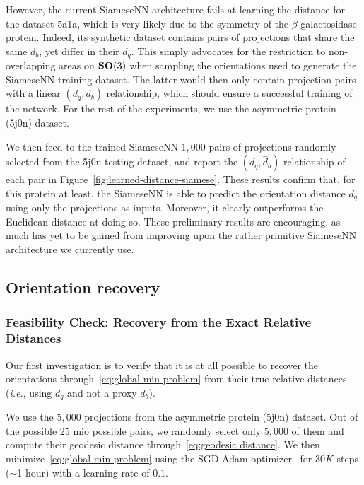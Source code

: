 However, the current SiameseNN architecture fails at learning the distance for the dataset 5a1a, which is very likely due to the symmetry of the $\beta$-galactosidase protein. Indeed, its synthetic dataset contains pairs of projections that share the same $d_b$, yet differ in their $d_q$. This simply advocates for the restriction to non-overlapping areas on $\mathrm{\mathbf{SO}}(3)$ when sampling the orientations used to generate the SiameseNN training dataset. The latter would then only contain projection pairs with a linear $(d_q,d_b)$ relationship, which should ensure a successful training of the network. For the rest of the experiments, we use the asymmetric protein (5j0n) dataset.

We then feed to the trained SiameseNN $1,000$ pairs of projections randomly selected from the 5j0n testing dataset, and report the $(d_q,\widehat{d}_b)$ relationship of each pair in Figure~\ref{fig:learned-distance-siamese}. These results confirm that, for this protein at least, the SiameseNN is able to predict the orientation distance $d_q$ using only the projections as inputs. Moreover, it clearly outperforms the Euclidean distance at doing so. These preliminary results are encouraging, as much has yet to be gained from improving upon the rather primitive SiameseNN architecture we currently use.

\subsection{Orientation recovery}

\subsubsection{Feasibility Check: Recovery from the Exact Relative Distances}
\label{subsec:5-6-3-sanity-check}

Our first investigation is to verify that it is at all possible to recover the orientations through~\eqref{eq:global-min-problem} from their true relative distances (\textit{i.e.}, using $d_q$ and not a proxy $d_b$).

We use the $5,000$ projections from the asymmetric protein (5j0n) dataset. Out of the possible 25 mio possible pairs, we randomly select only $5,000$ of them and compute their geodesic distance through~\eqref{eq:geodesic distance}. We then minimize~\eqref{eq:global-min-problem} using the SGD Adam optimizer~\cite{kingma2014adam} for $30K$ steps ($\sim$1 hour) with a learning rate of $0.1$.

